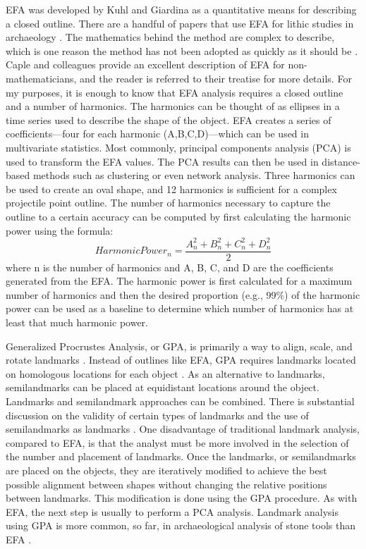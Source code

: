 \documentclass[PCJ,Unicode,screen,mode=plain]{cedram}
\begin{document}
EFA was developed by Kuhl and Giardina \autocite*{Kuhl1982-kd} as a quantitative means for describing a closed outline. There are a handful of papers that use EFA for lithic studies in archaeology \autocites[e.g.,][]{Cardillo2010-ys,Fox2015-ox,Gingerich2014-cb,Hoggard2019-yw,Iovita2011-nz,Iovita2011-zp,Matzig2021-id}. The mathematics behind the method are complex to describe, which is one reason the method has not been adopted as quickly as it should be \autocite[see][]{Caple2017-mk}. Caple and colleagues \autocite*{Caple2017-mk} provide an excellent description of EFA for non-mathematicians, and the reader is referred to their treatise for more details. For my purposes, it is enough to know that EFA analysis requires a closed outline and a number of harmonics. The harmonics can be thought of as ellipses in a time series used to describe the shape of the object. EFA creates a series of coefficients---four for each harmonic (A,B,C,D)---which can be used in multivariate statistics. Most commonly, principal components analysis (PCA) is used to transform the EFA values. The PCA results can then be used in distance-based methods such as clustering or even network analysis. Three harmonics can be used to create an oval shape, and 12 harmonics is sufficient for a complex projectile point outline. The number of harmonics necessary to capture the outline to a certain accuracy can be computed by first calculating the harmonic power using the formula: \[ HarmonicPower_n = \frac{A^2_n+B^2_n+C^2_n+D^2_n}{2} \] where n is the number of harmonics and A, B, C, and D are the coefficients generated from the EFA. The harmonic power is first calculated for a maximum number of harmonics and then the desired proportion (e.g., 99\%) of the harmonic power can be used as a baseline to determine which number of harmonics has at least that much harmonic power.

Generalized Procrustes Analysis, or GPA, is primarily a way to align, scale, and rotate landmarks \autocite{Gower1975-uv}. Instead of outlines like EFA, GPA requires landmarks located on homologous locations for each object \autocite{Rohlf1990-mp}. As an alternative to landmarks, semilandmarks can be placed at equidistant locations around the object. Landmarks and semilandmark approaches can be combined. There is substantial discussion on the validity of certain types of landmarks and the use of semilandmarks as landmarks \autocites[e.g.,][]{De_Groote2011-mh,MacLeod2017-yl,Okumura2019-ur,Shott2010-fn}. One disadvantage of traditional landmark analysis, compared to EFA, is that the analyst must be more involved in the selection of the number and placement of landmarks. Once the landmarks, or semilandmarks are placed on the objects, they are iteratively modified to achieve the best possible alignment between shapes without changing the relative positions between landmarks. This modification is done using the GPA procedure. As with EFA, the next step is usually to perform a PCA analysis. Landmark analysis using GPA is more common, so far, in archaeological analysis of stone tools than EFA \autocites[e.g.,][]{Archer2018-zi,Bischoff2020-zn,Buchanan2015-dx,Charlin2018-yg,Fisher2018-jq,Gingerich2014-cb,Herzlinger2017-ce,Lycett2010-od,Riede2019-gb,Selden2020-ni,Shott2010-fn,Smith2015-qk,Thulman2012-fo}.
\end{document}
